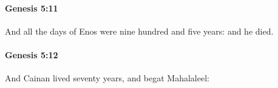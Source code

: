 		\paragraph{Genesis 5:11} %
			\label{GENESIS-5-11}

			And all the days of Enos were nine hundred and five years: and he died.


		\paragraph{Genesis 5:12} %
			\label{GENESIS-5-12}

			And Cainan lived seventy years, and begat Mahalaleel:


